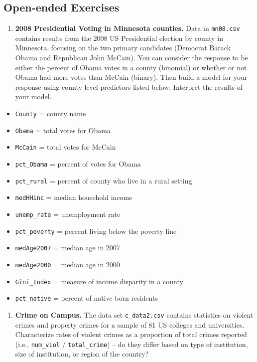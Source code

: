 \documentclass[
]{krantz}
\providecommand{\tightlist}{%
  \setlength{\itemsep}{0pt}\setlength{\parskip}{0pt}}
\begin{document}
\hypertarget{open-ended-exercises-2}{%
\subsection{Open-ended Exercises}\label{open-ended-exercises-2}}

\begin{enumerate}
\def\labelenumi{\arabic{enumi}.}
\tightlist
\item
  \textbf{2008 Presidential Voting in Minnesota counties.} Data in \texttt{mn08.csv} contains results from the 2008 US Presidential election by county in Minnesota, focusing on the two primary candidates (Democrat Barack Obama and Republican John McCain). You can consider the response to be either the percent of Obama votes in a county (binomial) or whether or not Obama had more votes than McCain (binary). Then build a model for your response using county-level predictors listed below. Interpret the results of your model.
\end{enumerate}

\begin{itemize}
\tightlist
\item
  \texttt{County} = county name
\item
  \texttt{Obama} = total votes for Obama
\item
  \texttt{McCain} = total votes for McCain
\item
  \texttt{pct\_Obama} = percent of votes for Obama
\item
  \texttt{pct\_rural} = percent of county who live in a rural setting
\item
  \texttt{medHHinc} = median household income
\item
  \texttt{unemp\_rate} = unemployment rate
\item
  \texttt{pct\_poverty} = percent living below the poverty line
\item
  \texttt{medAge2007} = median age in 2007
\item
  \texttt{medAge2000} = median age in 2000
\item
  \texttt{Gini\_Index} = measure of income disparity in a county
\item
  \texttt{pct\_native} = percent of native born residents
\end{itemize}

\begin{enumerate}
\def\labelenumi{\arabic{enumi}.}
\setcounter{enumi}{1}
\tightlist
\item
  \textbf{Crime on Campus.} The data set \texttt{c\_data2.csv} contains statistics on violent crimes and property crimes for a sample of 81 US colleges and universities. Characterize rates of violent crimes as a proportion of total crimes reported (i.e., \texttt{num\_viol} / \texttt{total\_crime}) -- do they differ based on type of institution, size of institution, or region of the country?
\end{enumerate}
\end{document}
